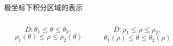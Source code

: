 \begin{frame}{极坐标下积分区域的表示}
	\linespread{1.2}\pause 
	\begin{columns}
			\begin{center}
				\pause 
			\end{center}
			$$D:\theta_1\leq\theta\leq\theta_2,$$
			$$\rho_1(\theta)\leq\rho\leq\rho_2(\theta)$$
		\pause 
			\begin{center}
				\pause 
			\end{center}
			$$D:\rho_1\leq\rho\leq\rho_2,$$
			$$\theta_1(\rho)\leq\theta\leq\theta_2(\rho)$$
	\end{columns}
\end{frame}

